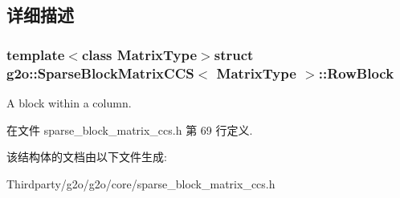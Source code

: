 \subsection{详细描述}
\subsubsection*{template$<$class Matrix\-Type$>$struct g2o\-::\-Sparse\-Block\-Matrix\-C\-C\-S$<$ Matrix\-Type $>$\-::\-Row\-Block}

A block within a column. 

在文件 sparse\-\_\-block\-\_\-matrix\-\_\-ccs.\-h 第 69 行定义.



该结构体的文档由以下文件生成\-:\begin{DoxyCompactItemize}
\item 
Thirdparty/g2o/g2o/core/sparse\-\_\-block\-\_\-matrix\-\_\-ccs.\-h\end{DoxyCompactItemize}
